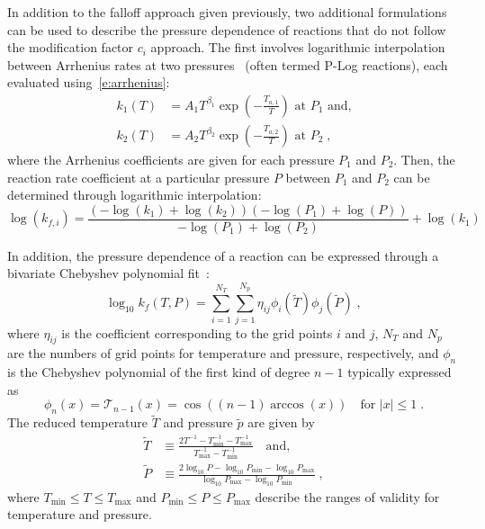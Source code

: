 \documentclass[12pt,number,sort&compress]{elsarticle}
\begin{document}
In addition to the falloff approach given previously, two additional formulations can be used to describe the pressure dependence of reactions that do not follow the modification factor $c_i$ approach.
The first involves logarithmic interpolation between Arrhenius rates at two pressures~\cite{chemkin:2012,Goodwin:2015aa} (often termed P-Log reactions), each evaluated using~\cref{e:arrhenius}:
\begin{align}
k_1 (T) &= A_1 T^{\beta_1} \exp \left( -\frac{T_{a, 1}}{T} \right) \text{ at } P_1 \text{ and,} \label{e:plog_k1} \\
k_2 (T) &= A_2 T^{\beta_2} \exp \left( -\frac{T_{a, 2}}{T} \right) \text{ at } P_2 \;, \label{e:plog_k2}
\end{align}
where the Arrhenius coefficients are given for each pressure $P_1$ and $P_2$.
Then, the reaction rate coefficient at a particular pressure $P$ between $P_1$ and $P_2$ can be determined through logarithmic interpolation:
\begin{equation}
\label{e:kf_plog}
\log{\left ({k_{f, i}} \right )} = \frac{\left(- \log{\left (k_{1} \right )} + \log{\left (k_{2} \right )}\right) \left(- \log{\left (P_{1} \right )} + \log{\left (P \right )}\right)}{- \log{\left (P_{1} \right )} + \log{\left (P_{2} \right )}} + \log{\left (k_{1} \right )}
\end{equation}

In addition, the pressure dependence of a reaction can be expressed through a bivariate Chebyshev polynomial fit~\cite{Venkatesh:1997hv,Venkatesh:1997ik,Venkatesh:2000gj,chemkin:2012,Goodwin:2015aa}:
\begin{equation}
\label{e:kf_cheb}
\log_{10} k_f (T, P) = \sum_{i = 1}^{N_T} \sum_{j = 1}^{N_p} \eta_{ij} \phi_i (\tilde{T}) \phi_j \left(\tilde{P}\right) \;,
\end{equation}
where $\eta_{ij}$ is the coefficient corresponding to the grid points $i$ and $j$, $N_T$ and $N_p$ are the numbers of grid points for temperature and pressure, respectively, and $\phi_n$ is the Chebyshev polynomial of the first kind of degree $n - 1$ typically expressed as
\begin{equation}
\phi_n (x) = \mathcal{T}_{n-1} (x) = \cos \left( (n - 1) \arccos (x) \right) \quad \text{for } |x| \leq 1 \;.
\end{equation}
The reduced temperature $\tilde{T}$ and pressure $\tilde{p}$ are given by
\begin{align}
\tilde{T} &\equiv \frac{2 T^{-1} - T^{-1}_{\min} - T^{-1}_{\max}}{T^{-1}_{\max} - T^{-1}_{\min}} \quad\text{and,} \\
\tilde{P} &\equiv \frac{2\log_{10} P - \log_{10} P_{\min} - \log_{10} P_{\max}}{\log_{10} P_{\max} - \log_{10} P_{\min}} \;,
\end{align}
where $T_{\min} \leq T \leq T_{\max}$ and $P_{\min} \leq P \leq P_{\max}$ describe the ranges of validity for temperature and pressure.
\end{document}
